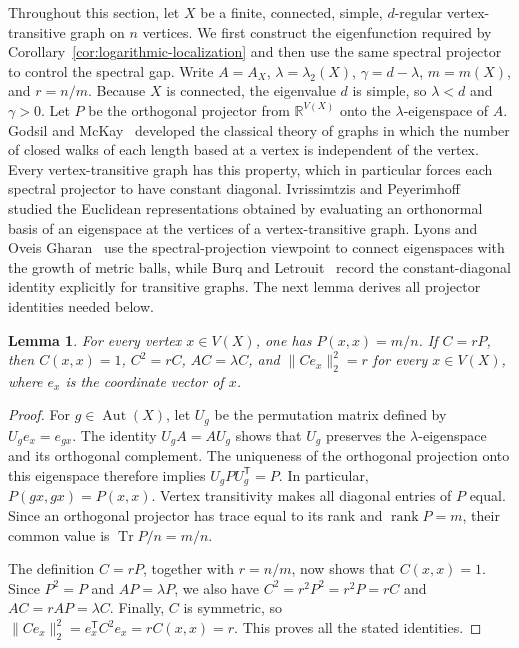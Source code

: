 \documentclass[11pt]{article}
\newtheorem{lemma}[theorem]{Lemma}
\theoremstyle{definition}
\theoremstyle{remark}
\begin{document}
Throughout this section, let $X$ be a finite, connected, simple, $d$-regular vertex-transitive graph on $n$ vertices. We first construct the eigenfunction required by Corollary~\ref{cor:logarithmic-localization} and then use the same spectral projector to control the spectral gap. Write $A=A_X$, $\lambda=\lambda_2(X)$, $\gamma=d-\lambda$, $m=m(X)$, and $r=n/m$. Because $X$ is connected, the eigenvalue $d$ is simple, so $\lambda<d$ and $\gamma>0$. Let $P$ be the orthogonal projector from $\mathbb R^{V(X)}$ onto the $\lambda$-eigenspace of $A$. Godsil and McKay~\cite{GodsilMcKay1980WalkRegular} developed the classical theory of graphs in which the number of closed walks of each length based at a vertex is independent of the vertex. Every vertex-transitive graph has this property, which in particular forces each spectral projector to have constant diagonal. Ivrissimtzis and Peyerimhoff~\cite{IvrissimtzisPeyerimhoff2013SpectralRepresentations} studied the Euclidean representations obtained by evaluating an orthonormal basis of an eigenspace at the vertices of a vertex-transitive graph. Lyons and Oveis Gharan~\cite[Section~6]{LyonsOveisGharan2018SpectralEmbedding} use the spectral-projection viewpoint to connect eigenspaces with the growth of metric balls, while Burq and Letrouit~\cite[Equation~(3.2)]{BurqLetrouit2026Delocalized} record the constant-diagonal identity explicitly for transitive graphs. The next lemma derives all projector identities needed below.

\begin{lemma}\label{lem:normalized-projector}
For every vertex $x\in V(X)$, one has $P(x,x)=m/n$. If $C=rP$, then $C(x,x)=1$, $C^2=rC$, $AC=\lambda C$, and $\|Ce_x\|_2^2=r$ for every $x\in V(X)$, where $e_x$ is the coordinate vector of $x$.
\end{lemma}

\begin{proof}
For $g\in\operatorname{Aut}(X)$, let $U_g$ be the permutation matrix defined by $U_ge_x=e_{gx}$. The identity $U_gA=AU_g$ shows that $U_g$ preserves the $\lambda$-eigenspace and its orthogonal complement. The uniqueness of the orthogonal projection onto this eigenspace therefore implies $U_gPU_g^{\mathsf T}=P$. In particular, $P(gx,gx)=P(x,x)$. Vertex transitivity makes all diagonal entries of $P$ equal. Since an orthogonal projector has trace equal to its rank and $\operatorname{rank}P=m$, their common value is $\operatorname{Tr}P/n=m/n$.

The definition $C=rP$, together with $r=n/m$, now shows that $C(x,x)=1$. Since $P^2=P$ and $AP=\lambda P$, we also have $C^2=r^2P^2=r^2P=rC$ and $AC=rAP=\lambda C$. Finally, $C$ is symmetric, so $\|Ce_x\|_2^2=e_x^{\mathsf T}C^2e_x=rC(x,x)=r$. This proves all the stated identities.
\end{proof}
\end{document}

